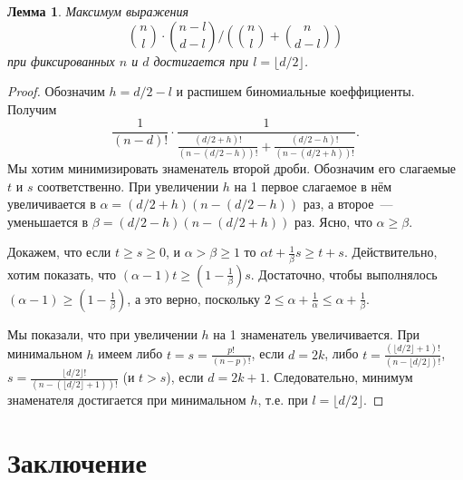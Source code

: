 \documentclass[12pt]{article}
\newtheorem{lemma}{Лемма}
\begin{document}
    \begin{lemma}
        \label{lm:middle}
        Максимум выражения
        $$
            \binom{n}{l}\cdot\binom{n-l}{d-l} / \left(\binom{n}{l} + \binom{n}{d-l}\right)
        $$
         при фиксированных $n$ и $d$ достигается при $l = \lfloor d/2 \rfloor$.
    \end{lemma}
    \begin{proof}
        Обозначим $h = d/2 - l$ и распишем биномиальные коеффициенты. Получим
        $$
            \frac{1}{(n-d)!}\cdot
            \frac{1}{\frac{(d/2+h)!}{(n-(d/2-h))!} + \frac{(d/2-h)!}{(n-(d/2+h))!}}.
        $$
        Мы хотим минимизировать знаменатель второй дроби. Обозначим его слагаемые $t$ и $s$ соответственно.
        При увеличении $h$ на 1 первое слагаемое в нём увеличивается в $\alpha = (d/2+h)(n-(d/2-h))$ раз,
        а второе~--- уменьшается в $\beta = (d/2-h)(n-(d/2+h))$ раз. Ясно, что $\alpha \ge \beta$.

        Докажем, что если $t\ge s\ge 0$, и $\alpha > \beta \ge 1$ то $\alpha t + \frac1\beta s\ge t+s$.
        Действительно, хотим показать, что $(\alpha - 1)t\ge(1-\frac1\beta)s$. Достаточно, чтобы выполнялось $(\alpha - 1)\ge(1-\frac1\beta)$,
        а это верно, поскольку $2 \le \alpha + \frac1\alpha \le \alpha + \frac1\beta$.

        Мы показали, что при увеличении $h$ на 1 знаменатель увеличивается.
        При минимальном $h$ имеем либо $t = s = \frac{p!}{(n-p)!}$, если $d = 2k$,
        либо $t = \frac{(\lfloor d/2 \rfloor + 1)!}{(n - \lfloor d/2 \rfloor)!}$,
        $s = \frac{\lfloor d/2 \rfloor!}{(n-(\lfloor d/2 \rfloor + 1))!}$ (и $t > s$),
        если $d = 2k + 1$.
        Следовательно, минимум знаменателя достигается при минимальном $h$, т.е. при $l = \lfloor d/2 \rfloor$.
    \end{proof}
    \section{Заключение}
    
    
\end{document}
